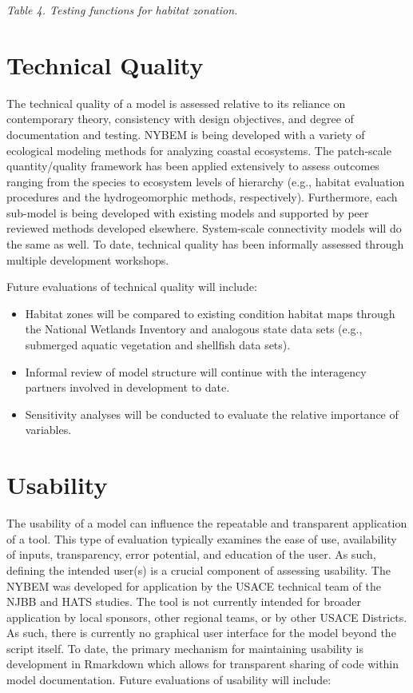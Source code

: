 \documentclass[
]{book}
\begin{document}
\emph{Table 4. Testing functions for habitat zonation.}

\hypertarget{technical-quality}{%
\section{Technical Quality}\label{technical-quality}}

The technical quality of a model is assessed relative to its reliance on contemporary theory, consistency with design objectives, and degree of documentation and testing. NYBEM is being developed with a variety of ecological modeling methods for analyzing coastal ecosystems. The patch-scale quantity/quality framework has been applied extensively to assess outcomes ranging from the species to ecosystem levels of hierarchy (e.g., habitat evaluation procedures and the hydrogeomorphic methods, respectively). Furthermore, each sub-model is being developed with existing models and supported by peer reviewed methods developed elsewhere. System-scale connectivity models will do the same as well. To date, technical quality has been informally assessed through multiple development workshops.

Future evaluations of technical quality will include:

\begin{itemize}
\item
  Habitat zones will be compared to existing condition habitat maps through the National Wetlands Inventory and analogous state data sets (e.g., submerged aquatic vegetation and shellfish data sets).
\item
  Informal review of model structure will continue with the interagency partners involved in development to date.
\item
  Sensitivity analyses will be conducted to evaluate the relative importance of variables.
\end{itemize}

\hypertarget{usability}{%
\section{Usability}\label{usability}}

The usability of a model can influence the repeatable and transparent application of a tool. This type of evaluation typically examines the ease of use, availability of inputs, transparency, error potential, and education of the user. As such, defining the intended user(s) is a crucial component of assessing usability. The NYBEM was developed for application by the USACE technical team of the NJBB and HATS studies. The tool is not currently intended for broader application by local sponsors, other regional teams, or by other USACE Districts. As such, there is currently no graphical user interface for the model beyond the script itself. To date, the primary mechanism for maintaining usability is development in Rmarkdown which allows for transparent sharing of code within model documentation.
Future evaluations of usability will include:
\end{document}
